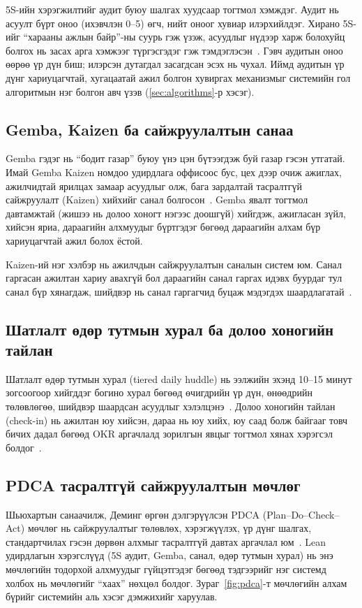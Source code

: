 5S-ийн хэрэгжилтийг аудит буюу шалгах хуудсаар тогтмол хэмждэг. Аудит нь асуулт бүрт оноо (ихэвчлэн 0--5) өгч, нийт оноог хувиар илэрхийлдэг. Хирано 5S-ийг ``харааны ажлын байр''-ны суурь гэж үзэж, асуудлыг нүдээр харж болохуйц болгох нь засах арга хэмжээг түргэсгэдэг гэж тэмдэглэсэн~\cite{hirano}. Гэвч аудитын оноо өөрөө үр дүн биш; илэрсэн дутагдал засагдсан эсэх нь чухал. Иймд аудитын үр дүнг хариуцагчтай, хугацаатай ажил болгон хувиргах механизмыг системийн гол алгоритмын нэг болгон авч үзэв (\ref{sec:algorithms}-р хэсэг).

\subsection{Gemba, Kaizen ба сайжруулалтын санаа}
Gemba гэдэг нь ``бодит газар'' буюу үнэ цэн бүтээгдэж буй газар гэсэн утгатай. Имай Gemba Kaizen номдоо удирдлага оффисоос бус, цех дээр очиж ажиглах, ажилчидтай ярилцах замаар асуудлыг олж, бага зардалтай тасралтгүй сайжруулалт (Kaizen) хийхийг санал болгосон~\cite{imai}. Gemba явалт тогтмол давтамжтай (жишээ нь долоо хоногт нэгээс доошгүй) хийгдэж, ажигласан зүйл, хийсэн яриа, дараагийн алхмуудыг бүртгэдэг бөгөөд дараагийн алхам бүр хариуцагчтай ажил болох ёстой.

Kaizen-ий нэг хэлбэр нь ажилчдын сайжруулалтын саналын систем юм. Санал гаргасан ажилтан хариу авахгүй бол дараагийн санал гаргах идэвх буурдаг тул санал бүр хянагдаж, шийдвэр нь санал гаргагчид буцаж мэдэгдэх шаардлагатай~\cite{imai,liker}.

\subsection{Шатлалт өдөр тутмын хурал ба долоо хоногийн тайлан}
Шатлалт өдөр тутмын хурал (tiered daily huddle) нь ээлжийн эхэнд 10--15 минут зогсоогоор хийгддэг богино хурал бөгөөд өчигдрийн үр дүн, өнөөдрийн төлөвлөгөө, шийдвэр шаардсан асуудлыг хэлэлцэнэ~\cite{mann}. Долоо хоногийн тайлан (check-in) нь ажилтан юу хийсэн, дараа нь юу хийх, юу саад болж байгааг товч бичих дадал бөгөөд OKR аргачлалд зорилгын явцыг тогтмол хянах хэрэгсэл болдог~\cite{doerr}.

\subsection{PDCA тасралтгүй сайжруулалтын мөчлөг}
Шьюхартын санаачилж, Деминг өргөн дэлгэрүүлсэн PDCA (Plan--Do--Check--Act) мөчлөг нь сайжруулалтыг төлөвлөх, хэрэгжүүлэх, үр дүнг шалгах, стандартчилах гэсэн дөрвөн алхмыг тасралтгүй давтах аргачлал юм~\cite{deming}. Lean удирдлагын хэрэгслүүд (5S аудит, Gemba, санал, өдөр тутмын хурал) нь энэ мөчлөгийн тодорхой алхмуудыг гүйцэтгэдэг бөгөөд тэдгээрийг нэг системд холбох нь мөчлөгийг ``хаах'' нөхцөл болдог. Зураг~\ref{fig:pdca}-т мөчлөгийн алхам бүрийг системийн аль хэсэг дэмжихийг харуулав.

